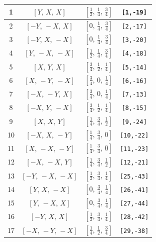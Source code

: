 \documentclass[fleqn,8pt]{jsarticle}
\begin{document}
\begin{longtable}{cccc}
1 & $\left[ Y,\, X,\, X \right]$ & $\left[ \frac{1}{2},\, \frac{1}{4},\, \frac{3}{4} \right]$ & {\tt [1,-19]} \\ \hline
2 & $\left[ - Y,\, - X,\, X \right]$ & $\left[ 0,\, \frac{1}{4},\, \frac{3}{4} \right]$ & {\tt [2,-17]} \\ \hline
3 & $\left[ - Y,\, X,\, - X \right]$ & $\left[ 0,\, \frac{1}{4},\, \frac{3}{4} \right]$ & {\tt [3,-20]} \\ \hline
4 & $\left[ Y,\, - X,\, - X \right]$ & $\left[ \frac{1}{2},\, \frac{1}{4},\, \frac{3}{4} \right]$ & {\tt [4,-18]} \\ \hline
5 & $\left[ X,\, Y,\, X \right]$ & $\left[ \frac{3}{4},\, \frac{1}{2},\, \frac{1}{4} \right]$ & {\tt [5,-14]} \\ \hline
6 & $\left[ X,\, - Y,\, - X \right]$ & $\left[ \frac{3}{4},\, 0,\, \frac{1}{4} \right]$ & {\tt [6,-16]} \\ \hline
7 & $\left[ - X,\, - Y,\, X \right]$ & $\left[ \frac{3}{4},\, 0,\, \frac{1}{4} \right]$ & {\tt [7,-13]} \\ \hline
8 & $\left[ - X,\, Y,\, - X \right]$ & $\left[ \frac{3}{4},\, \frac{1}{2},\, \frac{1}{4} \right]$ & {\tt [8,-15]} \\ \hline
9 & $\left[ X,\, X,\, Y \right]$ & $\left[ \frac{1}{4},\, \frac{3}{4},\, \frac{1}{2} \right]$ & {\tt [9,-24]} \\ \hline
10 & $\left[ - X,\, X,\, - Y \right]$ & $\left[ \frac{1}{4},\, \frac{3}{4},\, 0 \right]$ & {\tt [10,-22]} \\ \hline
11 & $\left[ X,\, - X,\, - Y \right]$ & $\left[ \frac{1}{4},\, \frac{3}{4},\, 0 \right]$ & {\tt [11,-23]} \\ \hline
12 & $\left[ - X,\, - X,\, Y \right]$ & $\left[ \frac{1}{4},\, \frac{3}{4},\, \frac{1}{2} \right]$ & {\tt [12,-21]} \\ \hline
13 & $\left[ - Y,\, - X,\, - X \right]$ & $\left[ \frac{1}{2},\, \frac{3}{4},\, \frac{1}{4} \right]$ & {\tt [25,-43]} \\ \hline
14 & $\left[ Y,\, X,\, - X \right]$ & $\left[ 0,\, \frac{3}{4},\, \frac{1}{4} \right]$ & {\tt [26,-41]} \\ \hline
15 & $\left[ Y,\, - X,\, X \right]$ & $\left[ 0,\, \frac{3}{4},\, \frac{1}{4} \right]$ & {\tt [27,-44]} \\ \hline
16 & $\left[ - Y,\, X,\, X \right]$ & $\left[ \frac{1}{2},\, \frac{3}{4},\, \frac{1}{4} \right]$ & {\tt [28,-42]} \\ \hline
17 & $\left[ - X,\, - Y,\, - X \right]$ & $\left[ \frac{1}{4},\, \frac{1}{2},\, \frac{3}{4} \right]$ & {\tt [29,-38]} \\ \hline

\end{longtable}
\end{document}
